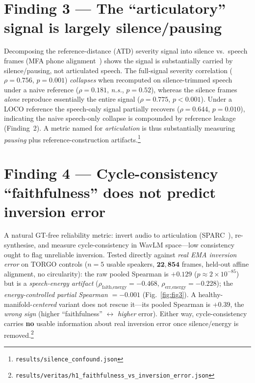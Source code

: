 \documentclass[10pt,twocolumn]{article}
\newcommand{\ns}{\emph{n.s.}}
\begin{document}
\section{Finding 3 --- The ``articulatory'' signal is largely silence/pausing}
Decomposing the reference-distance (ATD) severity signal into silence vs.\
speech frames (MFA phone alignment~\cite{mcauliffe2017mfa}) shows the signal is
substantially carried by silence/pausing, not articulated speech. The full-signal
severity correlation ($\rho{=}0.756$, $p{=}0.001$) \emph{collapses} when
recomputed on silence-trimmed speech under a naive reference ($\rho{=}0.181$,
\ns, $p{=}0.52$), whereas the silence frames \emph{alone} reproduce essentially
the entire signal ($\rho{=}0.775$, $p<0.001$). Under a LOCO reference the
speech-only signal partially recovers ($\rho{=}0.644$, $p{=}0.010$), indicating
the naive speech-only collapse is compounded by reference leakage (Finding~2).
A metric named for \emph{articulation} is thus substantially measuring
\emph{pausing} plus reference-construction
artifacts.\footnote{\texttt{results/silence\_confound.json}}

\section{Finding 4 --- Cycle-consistency ``faithfulness'' does not predict inversion error}
A natural GT-free reliability metric: invert audio to articulation
(SPARC~\cite{cho2024sparc}), re-synthesise, and measure cycle-consistency in
WavLM space---low consistency ought to flag unreliable inversion. Tested directly
against \emph{real EMA inversion error} on TORGO controls ($n{=}5$ usable
speakers, $\mathbf{22{,}854}$ frames, held-out affine alignment, no
circularity): the raw pooled Spearman is $+0.129$ ($p\approx 2\times10^{-85}$)
but is a \emph{speech-energy artifact} ($\rho_{\text{faith,energy}}{=}-0.468$,
$\rho_{\text{err,energy}}{=}-0.228$); the \emph{energy-controlled partial
Spearman} $=-0.001$ (Fig.~\ref{fig:fig3}). A healthy-manifold-\emph{centered}
variant does not rescue it---its pooled Spearman is $+0.39$, the \emph{wrong
sign} (higher ``faithfulness'' $\leftrightarrow$ \emph{higher} error). Either
way, cycle-consistency carries \textbf{no} usable information about real
inversion error once silence/energy is removed.\footnote{\texttt{results/veritas/h1\_faithfulness\_vs\_inversion\_error.json}}
\end{document}
